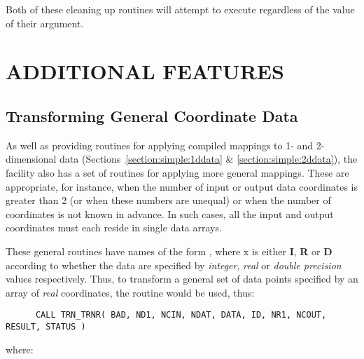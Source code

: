 Both of these cleaning up routines will attempt to execute regardless of the
value of their  argument. 


\section{ADDITIONAL FEATURES}


\subsection{Transforming General Coordinate Data}

\label{section:additional:generaldata}

As well as providing routines for applying compiled mappings to 1- and
2-dimensional data (Sections~\ref{section:simple:1ddata} \&
\ref{section:simple:2ddata}), the  facility also has a set
of routines for applying more general mappings. 
These are appropriate, for instance, when the number of input or output data
coordinates is greater than 2 (or when these numbers are unequal) or when
the number of coordinates is not known in advance. 
In such cases, all the input and output coordinates must each reside in
single data arrays. 

These general routines have names of the form , where x is
either {\bf I}, {\bf R} or {\bf D} according to whether the data are
specified by {\em integer}, {\em real} or {\em double precision} values
respectively. 
Thus, to transform a general set of data points specified by an array of
{\em real} coordinates, the routine  would be used, thus:

\begin{verbatim}
      CALL TRN_TRNR( BAD, ND1, NCIN, NDAT, DATA, ID, NR1, NCOUT, RESULT, STATUS )
\end{verbatim}

where:


